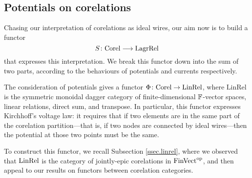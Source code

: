 \subsection{Potentials on corelations} \label{ssec:potentialsoncorelations}

Chasing our interpretation of corelations as ideal wires, our aim now is to
build a functor
\[
  S{\colon} \mathrm{Corel} \longrightarrow \mathrm{LagrRel}
\]
that expresses this interpretation. We break this functor down into the sum 
of two parts, according to the behaviours of potentials and currents
respectively. 

The consideration of potentials gives a functor $\Phi{\colon} \mathrm{Corel}
\to \mathrm{LinRel}$, where $\mathrm{LinRel}$ is the symmetric
monoidal dagger category of finite-dimensional ${\mathbb F}$-vector spaces, linear
relations, direct sum, and transpose. In particular, this functor expresses
Kirchhoff's voltage law: it requires that if two elements are in the same part
of the corelation partition---that is, if two nodes are connected by ideal
wires---then the potential at those two points must be the same.

To construct this functor, we recall Subsection \ref{ssec.linrel}, where we
observed that $\mathrm{LinRel}$ is the category of jointly-epic corelations in
$\mathrm{FinVect}^{\mathrm{op}}$, and then appeal to our results on functors between corelation
categories.

